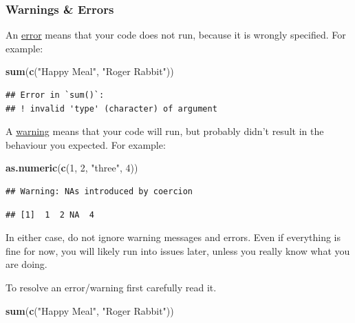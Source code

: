 \documentclass[
]{book}
\newenvironment{Shaded}{\begin{snugshade}}{\end{snugshade}}
\newcommand{\DecValTok}[1]{\textcolor[rgb]{0.00,0.00,0.81}{#1}}
\newcommand{\FunctionTok}[1]{\textcolor[rgb]{0.13,0.29,0.53}{\textbf{#1}}}
\newcommand{\NormalTok}[1]{#1}
\newcommand{\StringTok}[1]{\textcolor[rgb]{0.31,0.60,0.02}{#1}}
\begin{document}
\subsubsection{Warnings \& Errors}\label{warnings-errors}

An \ul{error} means that your code does not run, because it is wrongly specified. For example:

\begin{Shaded}
\begin{Highlighting}[]
\FunctionTok{sum}\NormalTok{(}\FunctionTok{c}\NormalTok{(}\StringTok{"Happy Meal"}\NormalTok{, }\StringTok{"Roger Rabbit"}\NormalTok{))}
\end{Highlighting}
\end{Shaded}

\begin{verbatim}
## Error in `sum()`:
## ! invalid 'type' (character) of argument
\end{verbatim}

A \ul{warning} means that your code will run, but probably didn't result in the behaviour you expected. For example:

\begin{Shaded}
\begin{Highlighting}[]
\FunctionTok{as.numeric}\NormalTok{(}\FunctionTok{c}\NormalTok{(}\DecValTok{1}\NormalTok{, }\DecValTok{2}\NormalTok{,  }\StringTok{"three"}\NormalTok{, }\DecValTok{4}\NormalTok{))}
\end{Highlighting}
\end{Shaded}

\begin{verbatim}
## Warning: NAs introduced by coercion
\end{verbatim}

\begin{verbatim}
## [1]  1  2 NA  4
\end{verbatim}

In either case, do not ignore warning messages and errors. Even if everything is fine for now, you will likely run into issues later, unless you really know what you are doing.

To resolve an error/warning first carefully read it.

\begin{Shaded}
\begin{Highlighting}[]
\FunctionTok{sum}\NormalTok{(}\FunctionTok{c}\NormalTok{(}\StringTok{"Happy Meal"}\NormalTok{, }\StringTok{"Roger Rabbit"}\NormalTok{))}
\end{Highlighting}
\end{Shaded}
\end{document}
